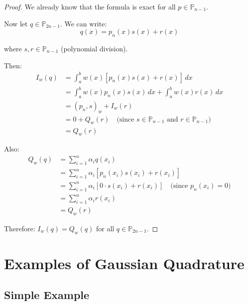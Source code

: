\begin{proof}
    We already know that the formula is exact for all $p \in \mathbb{P}_{n-1}$.

    Now let $q \in \mathbb{P}_{2n-1}$. We can write:
    \[q(x) = p_n(x) s(x) + r(x)\]

    where $s, r \in \mathbb{P}_{n-1}$ (polynomial division).

    Then:
    \begin{align}
        I_w(q) & = \int_a^b w(x) [p_n(x) s(x) + r(x)] \, dx                                                           \\
               & = \int_a^b w(x) p_n(x) s(x) \, dx + \int_a^b w(x) r(x) \, dx                                         \\
               & = (p_n, s)_w + I_w(r)                                                                                \\
               & = 0 + Q_w(r) \quad \text{(since } s \in \mathbb{P}_{n-1} \text{ and } r \in \mathbb{P}_{n-1}\text{)} \\
               & = Q_w(r)
    \end{align}

    Also:
    \begin{align}
        Q_w(q) & = \sum_{i=1}^n \alpha_i q(x_i)                                                              \\
               & = \sum_{i=1}^n \alpha_i [p_n(x_i) s(x_i) + r(x_i)]                                          \\
               & = \sum_{i=1}^n \alpha_i [0 \cdot s(x_i) + r(x_i)] \quad \text{(since } p_n(x_i) = 0\text{)} \\
               & = \sum_{i=1}^n \alpha_i r(x_i)                                                              \\
               & = Q_w(r)
    \end{align}

    Therefore: $I_w(q) = Q_w(q)$ for all $q \in \mathbb{P}_{2n-1}$.
\end{proof}

\section{Examples of Gaussian Quadrature}

\subsection{Simple Example}

